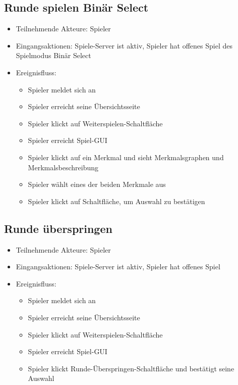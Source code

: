 \documentclass[a4paper]{scrreprt}
\begin{document}
	\subsection{Runde spielen Binär Select}
	\begin{itemize}
		\item Teilnehmende Akteure: \Gls{Spieler}
		\item Eingangsaktionen: Spiele-Server ist aktiv, Spieler hat offenes Spiel des Spielmodus Binär Select
		\item Ereignisfluss:
		\begin{itemize}
			\item Spieler meldet sich an
			\item Spieler erreicht seine Übersichtsseite
			\item Spieler klickt auf Weiterspielen-Schaltfläche
			\item Spieler erreicht Spiel-GUI
			\item Spieler klickt auf ein Merkmal und sieht Merkmalsgraphen und Merkmalsbeschreibung
			\item Spieler wählt eines der beiden Merkmale aus
			\item Spieler klickt auf Schaltfläche, um Auswahl zu bestätigen 
		\end{itemize}
	\end{itemize}

	\subsection{Runde überspringen}
	\begin{itemize}
		\item Teilnehmende Akteure: \Gls{Spieler}
		\item Eingangsaktionen: Spiele-Server ist aktiv, Spieler hat offenes Spiel 
		\item Ereignisfluss:
		\begin{itemize}
			\item Spieler meldet sich an
			\item Spieler erreicht seine Übersichtsseite
			\item Spieler klickt auf Weiterspielen-Schaltfläche
			\item Spieler erreicht Spiel-GUI
			\item Spieler klickt Runde-Überspringen-Schaltfläche und bestätigt seine Auswahl
		\end{itemize}
	\end{itemize}
\end{document}
